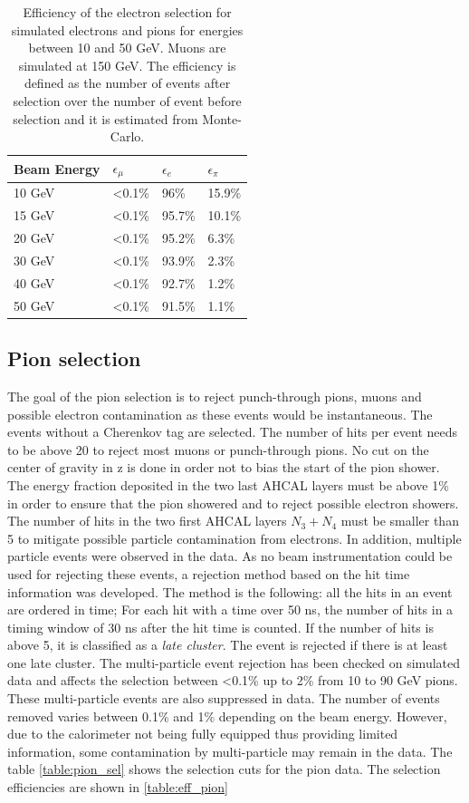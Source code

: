 \documentclass{JINST}
\begin{document}
\begin{table}[htb!]
	\centering
	\caption{Efficiency of the electron selection for simulated electrons and pions for energies between 10 and 50 GeV. Muons are simulated at 150 GeV. The efficiency is defined as the number of events after selection over the number of event before selection and it is estimated from Monte-Carlo.}
	\label{table:eff_electron}
	\begin{tabular}{@{} llll @{}}
		\toprule
		\textbf{Beam Energy} & \textbf{$\epsilon_{\mu}$} & \textbf{$\epsilon_{e}$} & \textbf{$\epsilon_{\pi}$}\\
		\midrule
		10 GeV & <0.1\% & 96\% & 15.9\%\\
		15 GeV & <0.1\% & 95.7\% & 10.1\%\\
		20 GeV & <0.1\% & 95.2\% & 6.3\%\\
		30 GeV & <0.1\% & 93.9\% & 2.3\%\\
		40 GeV & <0.1\% & 92.7\% & 1.2\%\\
		50 GeV & <0.1\% & 91.5\% & 1.1\%\\
		\bottomrule
	\end{tabular}
\end{table}

\subsection{Pion selection}
\label{sec:pionsel}

The goal of the pion selection is to reject punch-through pions, muons and possible electron contamination as these events would be instantaneous. The events without a Cherenkov tag are selected. The number of hits per event needs to be above 20 to reject most muons or punch-through pions. No cut on the center of gravity in z is done in order not to bias the start of the pion shower. The energy fraction deposited in the two last AHCAL layers must be above 1\% in order to ensure that the pion showered and to reject possible electron showers. The number of hits in the two first AHCAL layers $N_3+N_4$ must be smaller than 5 to mitigate possible particle contamination from electrons. In addition, multiple particle events were observed in the data. As no beam instrumentation could be used for rejecting these events, a rejection method based on the hit time information was developed. The method is the following: all the hits in an event are ordered in time; For each hit with a time over 50 ns, the number of hits in a timing window of 30 ns after the hit time is counted. If the number of hits is above 5, it is classified as a \textit{late cluster}. The event is rejected if there is at least one late cluster. The multi-particle event rejection has been checked on simulated data and affects the selection between <0.1\% up to 2\% from 10 to 90 GeV pions. These multi-particle events are also suppressed in data. The number of events removed varies between 0.1\% and 1\% depending on the beam energy. However, due to the calorimeter not being fully equipped thus providing limited information, some contamination by multi-particle may remain in the data. The table \ref{table:pion_sel} shows the selection cuts for the pion data. The selection efficiencies are shown in \ref{table:eff_pion}
\end{document}
